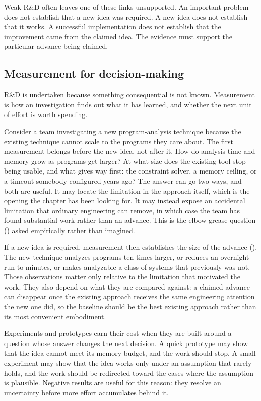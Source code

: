 Weak R\&D often leaves one of these links unsupported. An important problem does not establish that
a new idea was required. A new idea does not establish that it works. A successful implementation
does not establish that the improvement came from the claimed idea. The evidence must support the
particular advance being claimed.

\subsection{Measurement for decision-making}\label{sec-measurement-research-and-development}

R\&D is undertaken because something consequential is not known. Measurement is how an investigation
finds out what it has learned, and whether the next unit of effort is worth spending.

Consider a team investigating a new program-analysis technique because the existing technique cannot
scale to the programs they care about. The first measurement belongs before the new idea, not after
it. How do analysis time and memory grow as programs get larger? At what size does the existing tool
stop being usable, and what gives way first: the constraint solver, a memory ceiling, or a timeout
somebody configured years ago? The answer can go two ways, and both are useful. It may locate the
limitation in the approach itself, which is the opening the chapter has been looking for. It may
instead expose an accidental limitation that ordinary engineering can remove, in which case the team
has found substantial work rather than an advance. This is the elbow-grease question
(\citet{sec-elbow-grease}) asked empirically rather than imagined.

If a new idea is required, measurement then establishes the size of the advance (\citet{sec-how-large}).
The new technique analyzes programs ten times larger, or reduces an overnight run to minutes, or
makes analyzable a class of systems that previously was not. Those observations matter only relative
to the limitation that motivated the work. They also depend on what they are compared against: a
claimed advance can disappear once the existing approach receives the same engineering attention the
new one did, so the baseline should be the best existing approach rather than its most convenient
embodiment.

Experiments and prototypes earn their cost when they are built around a question whose answer
changes the next decision. A quick prototype may show that the idea cannot meet its memory budget,
and the work should stop. A small experiment may show that the idea works only under an assumption
that rarely holds, and the work should be redirected toward the cases where the assumption is
plausible. Negative results are useful for this reason: they resolve an uncertainty before more
effort accumulates behind it.

